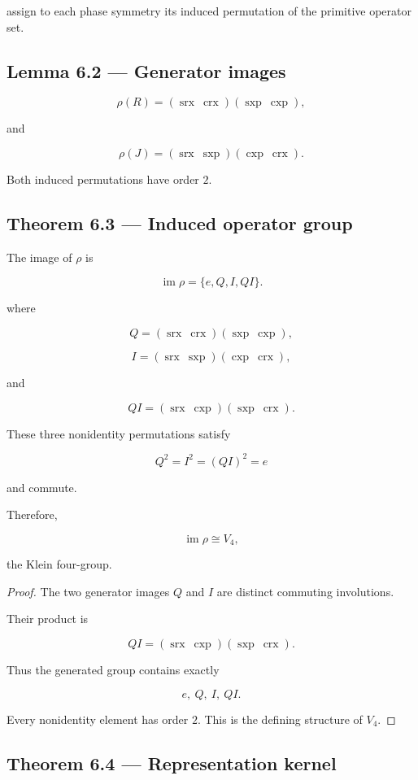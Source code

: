 \documentclass[11pt,oneside,openany]{book}
\newcommand{\PCsubsection}[1]{%
  \subsection*{#1}%
}
\begin{document}
assign to each phase symmetry its induced permutation of the primitive operator set.

\PCsubsection{Lemma 6.2 --- Generator images}

\[
\rho(R) = (\operatorname{srx}\ \operatorname{crx}) (\operatorname{sxp}\ \operatorname{cxp}),
\]


and

\[
\rho(J) = (\operatorname{srx}\ \operatorname{sxp}) (\operatorname{cxp}\ \operatorname{crx}).
\]


Both induced permutations have order \(2\).

\PCsubsection{Theorem 6.3 --- Induced operator group}

The image of \(\rho\) is

\[
\boxed{ \operatorname{im}\rho = \{e,Q,I,QI\} }.
\]

where

\[
Q = (\operatorname{srx}\ \operatorname{crx}) (\operatorname{sxp}\ \operatorname{cxp}),
\]

\[
I = (\operatorname{srx}\ \operatorname{sxp}) (\operatorname{cxp}\ \operatorname{crx}),
\]

and

\[
QI = (\operatorname{srx}\ \operatorname{cxp}) (\operatorname{sxp}\ \operatorname{crx}).
\]


These three nonidentity permutations satisfy

\[
Q^2=I^2=(QI)^2=e
\]

and commute.

Therefore,

\[
\boxed{ \operatorname{im}\rho\cong V_4, }
\]

the Klein four-group.

\begin{proof}
The two generator images \(Q\) and \(I\) are distinct commuting involutions.

Their product is

\[
QI = (\operatorname{srx}\ \operatorname{cxp}) (\operatorname{sxp}\ \operatorname{crx}).
\]

Thus the generated group contains exactly

\[
e,\ Q,\ I,\ QI.
\]

Every nonidentity element has order \(2\). This is the defining structure of \(V_4\).

\end{proof}

\PCsubsection{Theorem 6.4 --- Representation kernel}
\end{document}
